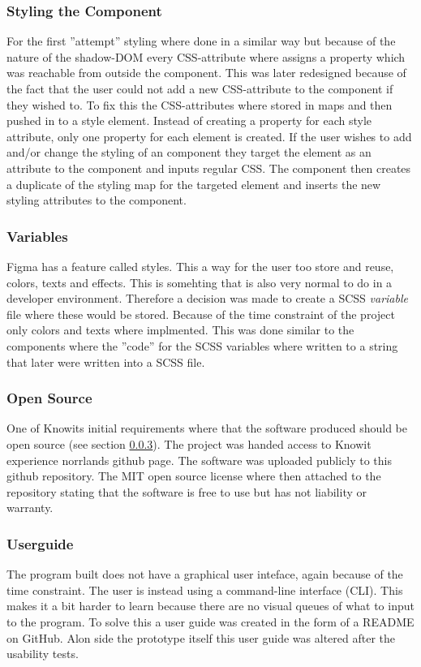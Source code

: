 \subsubsection{Styling the Component}%
\label{ssub:Styling the component}
For the first ''attempt'' styling where done in a similar way but because of the nature of the shadow-DOM every CSS-attribute where assigns a property which was reachable from outside the component. This was later redesigned because of the fact that the user could not add a new CSS-attribute to the component if they wished to. To fix this the CSS-attributes where stored in maps \cite{ArrayPrototypeMap} and then pushed in to a style element. Instead of creating a property for each style attribute, only one property for each element is created. If the user wishes to add and/or change the styling of an component they target the element as an attribute to the component and inputs regular CSS. The component then creates a duplicate of the styling map for the targeted element and inserts the new styling attributes to the component.


\subsubsection{Variables}%
\label{ssub:Variables}
Figma has a feature called styles. This a way for the user too store and reuse, colors, texts and effects. This is somehting that is also very normal to do in a developer environment. Therefore a decision was made to create a SCSS \textit{variable} file where these would be stored. Because of the time constraint of the project only colors and texts where implmented. This was done similar to the components where the ''code'' for the SCSS variables where written to a string that later were written into a SCSS file. 

\subsubsection{Open Source}%
\label{ssub:Open Source}
One of Knowits initial requirements where that the software produced should be open source (see section \ref{ssub:Open Source}). The project was handed access to Knowit experience norrlands github page. The software was uploaded publicly to this github repository. The MIT\cite{MITLicenseOpen} open source license where then attached to the repository stating that the software is free to use but has not liability or warranty.
 
\subsubsection{Userguide}%
\label{ssub:Userguide}
The program built does not have a graphical user inteface, again because of the time constraint. The user is instead using a command-line interface (CLI). This makes it a bit harder to learn because there are no visual queues of what to input to the program. To solve this a user guide was created in the form of a README on GitHub\cite{BuildSoftwareBetter}. Alon side the prototype itself this user guide was altered after the usability tests.

